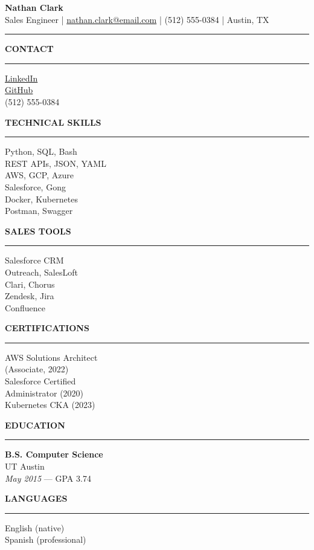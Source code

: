 \documentclass[11pt,a4paper]{article}
\newcommand{\leftsection}[1]{%
  \vspace{6pt}\noindent\textbf{\small\MakeUppercase{#1}}\vspace{1pt}\\
  \noindent\rule{\linewidth}{0.4pt}\vspace{3pt}%
}
\begin{document}
\begin{center}
  {\LARGE \textbf{Nathan Clark}}\\[3pt]
  Sales Engineer \quad|\quad
  \href{mailto:nathan.clark@email.com}{nathan.clark@email.com} \quad|\quad
  (512) 555-0384 \quad|\quad
  Austin, TX
\end{center}
\noindent\rule{\textwidth}{0.8pt}

\vspace{8pt}

\noindent
\begin{minipage}[t]{0.33\textwidth}

\leftsection{Contact}
\small
\href{https://linkedin.com/in/nathanclark}{LinkedIn}\\
\href{https://github.com/nathanclark}{GitHub}\\
(512) 555-0384

\leftsection{Technical Skills}
\small
Python, SQL, Bash\\
REST APIs, JSON, YAML\\
AWS, GCP, Azure\\
Salesforce, Gong\\
Docker, Kubernetes\\
Postman, Swagger

\leftsection{Sales Tools}
\small
Salesforce CRM\\
Outreach, SalesLoft\\
Clari, Chorus\\
Zendesk, Jira\\
Confluence

\leftsection{Certifications}
\small
AWS Solutions Architect\\
(Associate, 2022)\\[2pt]
Salesforce Certified\\
Administrator (2020)\\[2pt]
Kubernetes CKA (2023)

\leftsection{Education}
\small
\textbf{B.S. Computer Science}\\
UT Austin\\
\textit{May 2015} --- GPA 3.74

\leftsection{Languages}
\small
English (native)\\
Spanish (professional)

\end{minipage}%
\hfill
\end{document}
